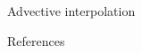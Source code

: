 \documentclass[final]{beamer}
\begin{document}
\begin{frame}{}
\begin{columns}[t]
\begin{column}{.3\linewidth}
\begin{block}{Advective interpolation}
      \end{block}
   
   
        \begin{block}{References}
        \small
       
        
         \end{block}


    \end{column}

  \end{columns}


  \vfill
\end{frame}
\end{document}
